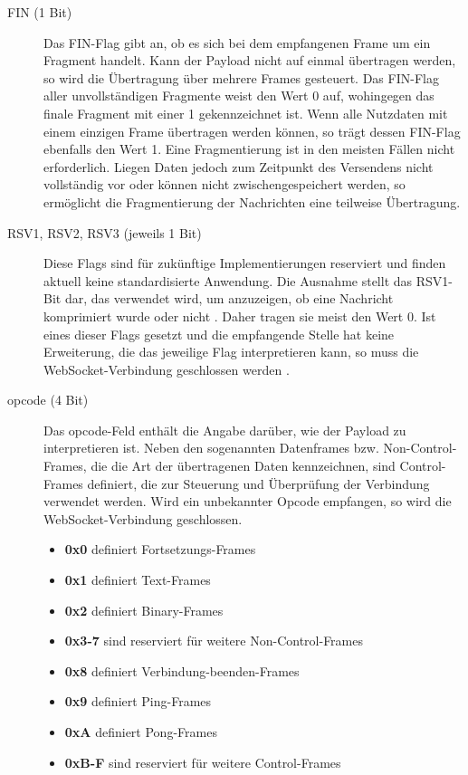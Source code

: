 \documentclass[11pt,a4paper,titlepage]{scrartcl}
\numberwithin{equation}{section}
\begin{document}
\begin{description}
	\item[FIN (1 Bit)] Das FIN-Flag gibt an, ob es sich bei dem empfangenen Frame um ein Fragment handelt. Kann der Payload nicht auf einmal übertragen werden, so wird die Übertragung über mehrere Frames gesteuert. Das FIN-Flag aller unvollständigen Fragmente weist den Wert 0 auf, wohingegen das finale Fragment mit einer 1 gekennzeichnet ist. Wenn alle Nutzdaten mit einem einzigen Frame übertragen werden können, so trägt dessen FIN-Flag ebenfalls den Wert 1. Eine Fragmentierung ist in den meisten Fällen nicht erforderlich. Liegen Daten jedoch zum Zeitpunkt des Versendens nicht vollständig vor oder können nicht zwischengespeichert werden, so ermöglicht die Fragmentierung der Nachrichten eine teilweise Übertragung. 
	\item[RSV1, RSV2, RSV3 (jeweils 1 Bit)] Diese Flags sind für zukünftige Implementierungen reserviert und finden aktuell keine standardisierte Anwendung. Die Ausnahme stellt das RSV1-Bit dar, das verwendet wird, um anzuzeigen, ob eine Nachricht komprimiert wurde oder nicht \autocite{internet_assigned_numbers_authority_websocket_2011}. Daher tragen sie meist den Wert 0. Ist eines dieser Flags gesetzt und die empfangende Stelle hat keine Erweiterung, die das jeweilige Flag interpretieren kann, so muss die WebSocket-Verbindung geschlossen werden \autocite[27]{fette_websocket_2011}. 
	\item[opcode (4 Bit)] Das opcode-Feld enthält die Angabe darüber, wie der Payload zu interpretieren ist. Neben den sogenannten Datenframes bzw. Non-Control-Frames, die die Art der übertragenen Daten kennzeichnen, sind Control-Frames definiert, die zur Steuerung und Überprüfung der Verbindung verwendet werden. Wird ein unbekannter Opcode empfangen, so wird die WebSocket-Verbindung geschlossen.
	\begin{itemize}
		\item \textbf{0x0} definiert Fortsetzungs-Frames
		\item \textbf{0x1} definiert Text-Frames
		\item \textbf{0x2} definiert Binary-Frames
		\item \textbf{0x3-7} sind reserviert für weitere Non-Control-Frames
		\item \textbf{0x8} definiert Verbindung-beenden-Frames
		\item \textbf{0x9} definiert Ping-Frames
		\item \textbf{0xA} definiert Pong-Frames
		\item \textbf{0xB-F} sind reserviert für weitere Control-Frames

\end{itemize}
\end{description}
\end{document}
